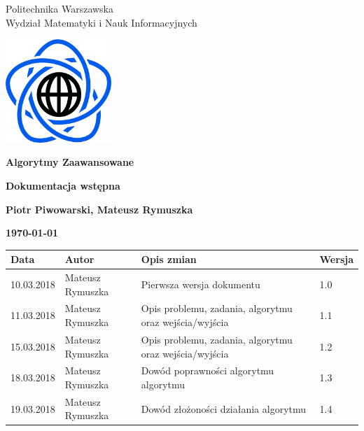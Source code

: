 \documentclass[10pt,a4paper]{article}
\begin{document}
	\begin{titlepage}
		\begin{center}
			{\fontsize{14}{12}\selectfont Politechnika Warszawska \\ Wydział Matematyki i Nauk Informacyjnych}
			
		\end{center}
		
		\vspace{1cm}
		\begin{center}
			\includegraphics[width=0.3\textwidth]{images/logo.png}
		\end{center}
		\vspace{3cm}
		
		\begin{center}
			\textbf{{\fontsize{26}{12}\selectfont Algorytmy Zaawansowane}}
			
			\vspace{2cm}
			\textbf{{\fontsize{22}{12}\selectfont Dokumentacja wstępna}}
			\vspace{1cm}
			
			\textbf{{\fontsize{13.5}{12}\selectfont Piotr Piwowarski, Mateusz Rymuszka}}
			
			\vspace{6cm}
			\textbf{{\fontsize{13.5}{12}\selectfont \today}}
		\end{center}  
	\end{titlepage}
	
	{\fontsize{13.5}{12}\selectfont
		\tableofcontents
		\vspace{1cm}
		{\renewcommand{\arraystretch}{2.0}
			
			\begin{tabularx}{\textwidth}{|l|l|X|l|}
				\hline 
				Data & Autor & Opis zmian & Wersja\\
				\hline
				10.03.2018 & Mateusz Rymuszka & Pierwsza wersja dokumentu & 1.0 \\
				\hline
				11.03.2018 & Mateusz Rymuszka & Opis problemu, zadania, algorytmu oraz wejścia/wyjścia & 1.1 \\
				\hline
				15.03.2018 & Mateusz Rymuszka & Opis problemu, zadania, algorytmu oraz wejścia/wyjścia & 1.2 \\
				\hline
				18.03.2018 & Mateusz Rymuszka & Dowód poprawności algorytmu algorytmu & 1.3 \\
				\hline
				19.03.2018 & Mateusz Rymuszka & Dowód złożoności działania algorytmu & 1.4 \\
				\hline
			\end{tabularx} 
	}}
	
\end{document}
